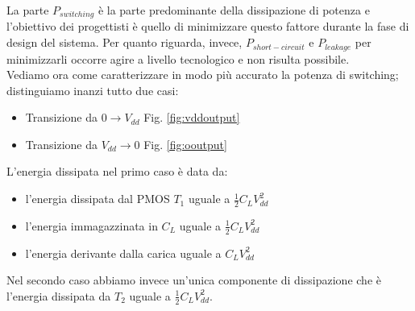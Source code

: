 La parte $P_{switching}$ è la parte predominante della dissipazione di potenza e l'obiettivo dei progettisti è quello di minimizzare questo fattore durante la fase di design del sistema. Per quanto riguarda, invece, $P_{short-circuit}$ e $P_{leakage}$ per minimizzarli occorre agire a livello tecnologico e non risulta possibile.\\
Vediamo ora come caratterizzare in modo più accurato la potenza di switching; distinguiamo inanzi tutto due casi:
\begin{itemize}
\item Transizione da $0 \rightarrow V_{dd}$ Fig. \ref{fig:vddoutput}
\item Transizione da $V_{dd} \rightarrow 0$ Fig. \ref{fig:ooutput}
\end{itemize}
\begin{figure}
\end{figure}
L'energia dissipata nel primo caso è data da:
\begin{itemize}
\item l'energia dissipata dal PMOS $T_1$ uguale a $\frac{1}{2}C_LV_{dd}^2$
\item l'energia immagazzinata in $C_L$ uguale a $\frac{1}{2}C_LV_{dd}^2$
\item l'energia derivante dalla carica uguale a $C_LV_{dd}^2$
\end{itemize}
Nel secondo caso abbiamo invece un'unica componente di dissipazione che è l'energia dissipata da $T_2$ uguale a $\frac{1}{2}C_LV_{dd}^2$.\\
